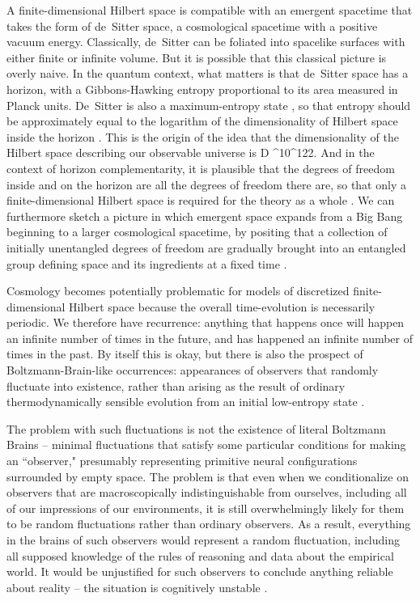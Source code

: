 \documentclass[aps,prd,twocolumn,nofootinbib,notitlepage]{revtex4-1}
\begin{document}
A finite-dimensional Hilbert space is compatible with an emergent spacetime that takes the form of de~Sitter space, a cosmological spacetime with a positive vacuum energy.
Classically, de~Sitter can be foliated into spacelike surfaces with either finite or infinite volume.
But it is possible that this classical picture is overly naive. 
In the quantum context, what matters is that de~Sitter space has a horizon, with a Gibbons-Hawking entropy proportional to its area measured in Planck units.
De~Sitter is also a maximum-entropy state \cite{Carroll:2017kjo}, so that entropy should be approximately equal to the logarithm of the dimensionality of Hilbert space inside the horizon \cite{Banks:2000fe}.
This is the origin of the idea that the dimensionality of the Hilbert space describing our observable universe is
\be
  D ^{10^{122}}.
\ee
And in the context of horizon complementarity, it is plausible that the degrees of freedom inside and on the horizon are all the degrees of freedom there are, so that only a finite-dimensional Hilbert space is required for the theory as a whole \cite{Nomura:2011dt,Bousso:2011up}.
We can furthermore sketch a picture in which emergent space expands from a Big Bang beginning to a larger cosmological spacetime, by positing that a collection of initially unentangled degrees of freedom are gradually brought into an entangled group defining space and its ingredients at a fixed time \cite{circuitcosmo}.

Cosmology becomes potentially problematic for models of discretized finite-dimensional Hilbert space because the overall time-evolution is necessarily periodic.
We therefore have recurrence: anything that happens once will happen an infinite number of times in the future, and has happened an infinite number of times in the past.
By itself this is okay, but there is also the prospect of Boltzmann-Brain-like occurrences: appearances of observers that randomly fluctuate into existence, rather than arising as the result of ordinary thermodynamically sensible evolution from an initial low-entropy state \cite{Dyson2002,Albrecht_2004,Carroll:2008yd}.

The problem with such fluctuations is not the existence of literal Boltzmann Brains -- minimal fluctuations that satisfy some particular conditions for making an ``observer," presumably representing primitive neural configurations surrounded by empty space.
The problem is that even when we conditionalize on observers that are macroscopically indistinguishable from ourselves, including all of our impressions of our environments, it is still overwhelmingly likely for them to be random fluctuations rather than ordinary observers.
As a result, everything in the brains of such observers would represent a random fluctuation, including all supposed knowledge of the rules of reasoning and data about the empirical world.
It would be unjustified for such observers to conclude anything reliable about reality -- the situation is cognitively unstable \cite{Carroll2017}.
\end{document}
